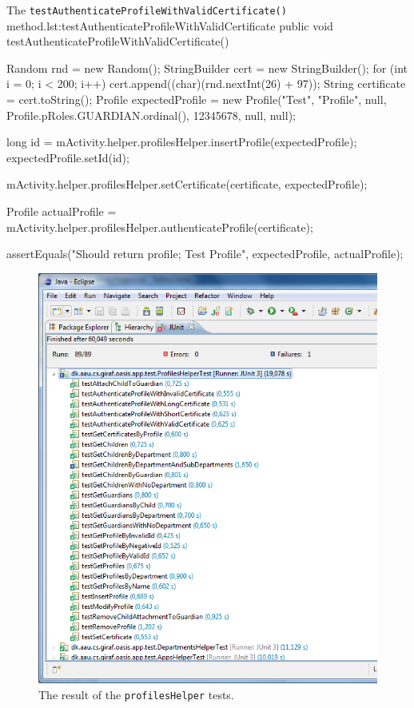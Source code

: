 \begin{Java}{The \texttt{testAuthenticateProfileWithValidCertificate()} method.}{lst:testAuthenticateProfileWithValidCertificate}
public void testAuthenticateProfileWithValidCertificate() {
	Random rnd = new Random();
	StringBuilder cert = new StringBuilder();
	for (int i = 0; i < 200; i++)
	{
		cert.append((char)(rnd.nextInt(26) + 97));
	}
	String certificate = cert.toString();
	Profile expectedProfile = new Profile("Test", "Profile", null, Profile.pRoles.GUARDIAN.ordinal(), 12345678, null, null);

	long id = mActivity.helper.profilesHelper.insertProfile(expectedProfile);
	expectedProfile.setId(id);
	
	mActivity.helper.profilesHelper.setCertificate(certificate, expectedProfile);

	Profile actualProfile = mActivity.helper.profilesHelper.authenticateProfile(certificate);

	assertEquals("Should return profile; Test Profile", expectedProfile, actualProfile);
}
\end{Java}


\begin{figure}[htbp]
	\centering
		\includegraphics[width=\textwidth]{Images/unit_testing/profile_helper_tests.PNG}
	\caption{The result of the \texttt{profilesHelper} tests.}
	\label{fig:profile_helper_tests}
\end{figure}




